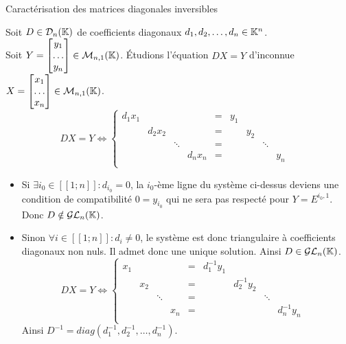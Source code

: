 \documentclass{article}
\renewenvironment{question_kholle}[2][ ]
{
	\subsection{\texorpdfstring{#2}{}}
	\notblank{#1}
	{
		\noindent #1
		\bigbreak
	}
	{}
	\begin{proof}
}
{
	\end{proof}
}
\begin{document}
	\begin{question_kholle}
		[Une matrice diagonale est inversible si et seulement si tous ses coefficients diagonaux sont non nuls.
		\begin{equation}
			\forall D = diag(d_1, d_2, \ldots, d_n) \in \mathcal{D}_n(\K),
			D \in \mathcal{GL}_n(\K) \iff \prod_{i=1}^{n} d_i \neq 0
		\end{equation}]
		{Caractérisation des matrices diagonales inversibles}
		
		Soit $D \in \mathcal{D}_n(\mathbb K)$ de coefficients diagonaux $d_1, d_2, \ldots, d_n \in \mathbb K^n$. \\
		Soit $Y = \begin{bmatrix} y_1 \\ \ldots \\ y_n \end{bmatrix} \in \mathcal{M}_{n,1}(\mathbb K)$.
		\'Etudions l'équation $DX = Y$ d'inconnue $X = \begin{bmatrix} x_1 \\ \ldots \\ x_n \end{bmatrix} \in \mathcal{M}_{n,1}(\mathbb K)$.
		\begin{equation*}
			DX = Y \iff
			\left\{ \begin{array}{cccccccccc}
				d_1 x_1 & & & & = & y_1 & & & \\
				& d_2 x_2 & & & = & & y_2 & & & \\
				& & \ddots & & = & & & \ddots & \\
				& & & d_n x_n & = & & & & y_n \\
			\end{array} \right.
		\end{equation*}

		\begin{itemize}
			\item Si $\exists i_0 \in [\![1;n]\!] : d_{i_0} = 0$, la $i_0$-ème ligne du système ci-dessus deviens une condition de compatibilité $0 = y_{i_0}$ qui ne sera pas respecté pour $Y = E^{i_0,1}$. Donc $D \notin \mathcal{GL}_{n}(\mathbb K)$.
			\item Sinon $\forall i \in [\![1;n]\!] : d_i \neq 0$, le système est donc triangulaire à coefficients diagonaux non nuls. Il admet donc une unique solution. Ainsi $D \in \mathcal{GL}_{n}(\mathbb K)$.
			\begin{equation*}
				DX = Y \iff
				\left\{ \begin{array}{cccccccccc}
					x_1 & & & & = & d_1^{-1} y_1 & & & \\
					& x_2 & & & = & & d_2^{-1} y_2 & & & \\
					& & \ddots & & = & & & \ddots & \\
					& & & x_n & = & & & & d_n^{-1} y_n \\
				\end{array} \right.
			\end{equation*}
			Ainsi $D^{-1} = diag\left(d_1^{-1}, d_2^{-1}, \ldots, d_n^{-1}\right)$.
		\end{itemize}
	\end{question_kholle}
\end{document}
